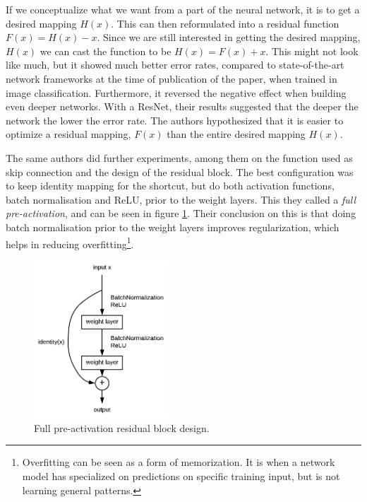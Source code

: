 If we conceptualize what we want from a part of the neural network, it is to get a desired mapping $H(x)$. This can then reformulated into a residual function $F(x) = H(x) - x$. Since we are still interested in getting the desired mapping, $H(x)$ we can cast the function to be $H(x) = F(x) + x$. This might not look like much, but it showed much better error rates, compared to state-of-the-art network frameworks at the time of publication of the paper, when trained in image classification. Furthermore, it reversed the negative effect when building even deeper networks. With a ResNet, their results suggested that the deeper the network the lower the error rate. The authors hypothesized that it is easier to optimize a residual mapping, $F(x)$ than the entire desired mapping $H(x)$\cite{HeKaimingandZhangXiangyuandRenShaoqingandSun2016}.

The same authors did further experiments, among them on the function used as skip connection and the design of the residual block. The best configuration was to keep identity mapping for the shortcut, but do both activation functions, batch normalisation and ReLU, prior to the weight layers. This they called a \textit{full pre-activation}, and can be seen in figure \ref{fig-fpa-block}\cite{He2016}. Their conclusion on this is that doing batch normalisation prior to the weight layers improves regularization, which helps in reducing overfitting\footnote{Overfitting can be seen as a form of memorization. It is when a network model has specialized on predictions on specific training input, but is not learning general patterns.}.

\begin{figure}[ht]
	\centering
	\includegraphics[width=0.45\textwidth]{figures/fpa-block-2}
	\caption{Full pre-activation residual block design.}
	\label{fig-fpa-block}
\end{figure}

